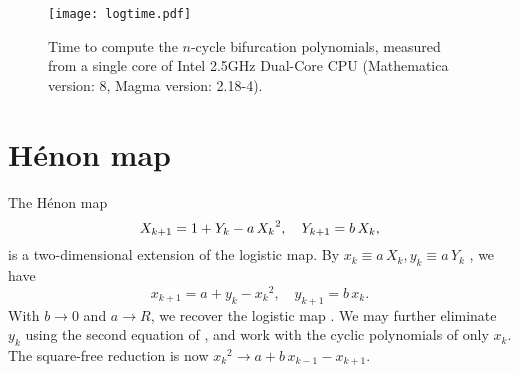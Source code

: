 \documentclass{ws-ijbc}
\begin{document}
\begin{figure}[h]
  \begin{center}
  \begin{minipage}{\linewidth}
        \texttt{[image: logtime.pdf]}
  \end{minipage}%
  \end{center}
  \caption{\label{fig:logtime}
  Time to compute the $n$-cycle bifurcation polynomials,
    measured from a single core of
    Intel\textsuperscript{\textregistered} 2.5GHz Dual-Core CPU
  (Mathematica version: 8, Magma version: 2.18-4).
  }
\end{figure}
%










\section{\label{sec:henon}H\'enon map}




The H\'enon map \cite{henon}
\begin{equation}
  X_{k+1} = 1 + Y_k - a \, {X_k}^2, \quad
  Y_{k+1} = b \, X_k,
\notag
\end{equation}
is a two-dimensional extension of the logistic map.
%
By
  $x_k \equiv a \, X_k,
   y_k \equiv a \, Y_k$
\cite{huang},
we have
\begin{equation}
  x_{k+1} = a + y_k - {x_k}^2, \quad
  y_{k+1} = b \, x_k.
\label{eq:henons}
\end{equation}
%
%
With $b \rightarrow 0$ and $a \rightarrow R$,
we recover the logistic map .
%
%
We may further eliminate $y_k$ using the second equation of ,
  and work with the cyclic polynomials of only $x_k$.
The square-free reduction is now
  ${x_k}^2 \rightarrow a + b \, x_{k-1} - x_{k+1}$.
\end{document}
